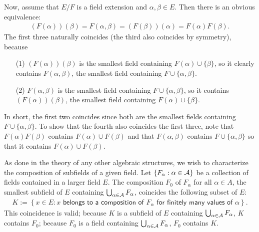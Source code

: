 \begin{obs}
    Now, assume that $E/F$ is a field extension and $\alpha, \beta\in E$.
    Then there is an obvious equivalence:
    \begin{align*}
        (F(\alpha))(\beta)=F(\alpha, \beta)=(F(\beta))(\alpha)=F(\alpha)F(\beta).
    \end{align*}
    The first three naturally coincides (the third also coincides by symmetry), because
    \begin{enumerate}
        \item[(1)]
        {
            $(F(\alpha))(\beta)$ is the smallest field containing $F(\alpha)\cup\{\beta\}$, so it clearly contains $F(\alpha, \beta)$, the smallest field containing $F\cup\{\alpha, \beta\}$.
        }
        \item[(2)]
        {
            $F(\alpha, \beta)$ is the smallest field containing $F\cup\{\alpha, \beta\}$, so it contains $(F(\alpha))(\beta)$, the smallest field containing $F(\alpha)\cup\{\beta\}$.
        }
    \end{enumerate}
    In short, the first two coincides since both are the smallest fields containing $F\cup\{\alpha, \beta\}$.
    To show that the fourth also coincides the first three, note that $F(\alpha)F(\beta)$ contains $F(\alpha)\cup F(\beta)$ and that $F(\alpha, \beta)$ contains $F\cup\{\alpha, \beta\}$ so that it contains $F(\alpha)\cup F(\beta)$.
\end{obs}
\begin{rmk}\label{Characterization of the composition of fields}
    As done in the theory of any other algebraic structures, we wish to characterize the composition of subfields of a given field.
    Let $\{F_\alpha: \alpha\in{\mathcal{A}}\}$ be a collection of fields contained in a larger field $E$.
    The composition $F_0$ of $F_\alpha$ for all $\alpha\in A$, the smallest subfield of $E$ containing $\bigcup_{\alpha\in{\mathcal{A}}} F_\alpha$, coincides the following subset of $E$:
    \begin{align*}
        K:=\left\{x\in E: \textsf{$x$ belongs to a composition of $F_\alpha$ for finitely many values of $\alpha$}\right\}.
    \end{align*}
    This coincidence is valid; because $K$ is a subfield of $E$ containing $\bigcup_{\alpha\in{\mathcal{A}}} F_\alpha$, $K$ contains $F_0$; because $F_0$ is a field containing $\bigcup_{\alpha\in{\mathcal{A}}} F_\alpha$, $F_0$ contains $K$.
\end{rmk}

